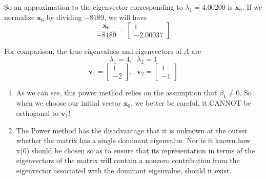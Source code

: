 \begin{ex}
	So an approximation to the eigenvector corresponding to $\lambda_1 = 4.00200$ is $\mathbf{x}_6$. If we normalize $\mathbf{x}_6$ by dividing $-8189$, we will have
	\[ \frac{\mathbf{x}_6}{-8189} = \begin{bmatrix} 1\\ -2.00037 \end{bmatrix} \]
	
	For comparison, the true eigenvalues and eigenvectors of $A$ are
	\[ \lambda_1 = 4,\;\; \lambda_2 = 1 \]
	\[ \mathbf{v}_1 = \begin{bmatrix} 1\\-2 \end{bmatrix},\;\;
	\mathbf{v}_2 = \begin{bmatrix} 1\\-1 \end{bmatrix} \]
\end{ex}
\begin{warning}
	\begin{enumerate}
		\item
		As we can see, this power method relies on the assumption that $\beta_1 \neq 0$. So when we choose our initial vector $\mathbf{x}_0$, we better be careful, it CANNOT be orthogonal to $\mathbf{v}_1$! 
		\item 
		The Power method has the disadvantage that it is unknown at the outset whether the matrix has a single dominant eigenvalue. Nor is it known how x(0) should be chosen so as to ensure that its representation in terms of the eigenvectors of the matrix will contain a nonzero contribution from the eigenvector associated with the dominant eigenvalue, should it exist.
	\end{enumerate}
	
\end{warning}
